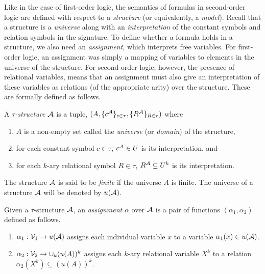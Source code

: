 \documentclass[11pt,twoside=off,numbers=noenddot]{scrbook}
\begin{document}
Like in the case of first-order logic, the semantics of formulas in second-order logic are defined with respect to a \emph{structure} (or equivalently, a \emph{model}). Recall that a structure is a \emph{universe} along with an \emph{interpretation} of the constant symbols and relation symbols in the signature. To define whether a formula holds in a structure, we also need an \emph{assignment}, which interprets free variables. For first-order logic, an assignment was simply a mapping of variables to elements in the universe of the structure. For second-order logic, however, the presence of relational variables, means that an assignment must also give an interpretation of these variables as relations (of the appropriate arity) over the structure. These are formally defined as follows.

\begin{definition}
  A \emph{$\tau$-structure} $\mathcal{A}$ is a tuple, $(A, \{ c^{\mathcal{A}} \}_{c \in \tau}, \{ R^{\mathcal{A}} \}_{R \in \tau})$ where
  \begin{enumerate}
    \item $A$ is a non-empty set called the \emph{universe} (or \emph{domain}) of the structure,
    \item for each constant symbol $c \in \tau$, $c^{\mathcal{A}} \in U$ is its interpretation, and
    \item for each $k$-ary relational symbol $R \in \tau$, $R^{\mathcal{A}} \subseteq U^k$ is its interpretation.
  \end{enumerate}
\end{definition}

The structure $\mathcal{A}$ is said to be \emph{finite} if the universe $A$ is finite. The universe of a structure $\mathcal{A}$ will be denoted by $u(\mathcal{A})$.

\begin{definition}
  Given a $\tau$-structure $\mathcal{A}$, an \emph{assignment} $\alpha$ over $\mathcal{A}$ is a pair of functions $(\alpha_1, \alpha_2)$ defined as follows.
  \begin{enumerate}
    \item $\alpha_1 : \mathcal{V}_1 \to u(\mathcal{A})$ assigns each individual variable $x$ to a variable $\alpha_1(x) \in u(\mathcal{A})$.
    \item $\alpha_2 : \mathcal{V}_2 \to \cup_k (u(A))^k$ assigns each $k$-ary relational variable $X^k$ to a relation $\alpha_2(X^k) \subseteq (u(A))^k$.
  \end{enumerate}
\end{definition}
\end{document}
